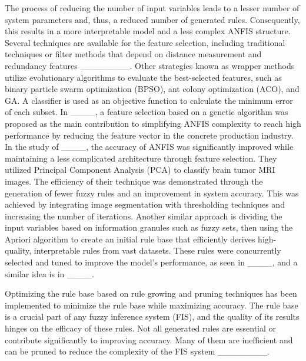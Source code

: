 The process of reducing the number of input variables leads to a lesser number of system parameters and, thus, a reduced number of generated rules. Consequently, this results in a more interpretable model and a less complex ANFIS structure. Several techniques are available for the feature selection, including traditional techniques or filter methods that depend on distance measurement and redundancy features ________. Other strategies known as wrapper methods utilize evolutionary algorithms to evaluate the best-selected features, such as binary particle swarm optimization (BPSO), ant colony optimization (ACO), and GA. A classifier is used as an objective function to calculate the minimum error of each subset.
In ____, a feature selection based on a genetic algorithm was proposed as the main contribution to simplifying ANFIS complexity to reach high performance by reducing the feature vector in the concrete production industry.
In the study of ____, the accuracy of ANFIS was significantly improved while maintaining a less complicated architecture through feature selection. They utilized Principal Component Analysis (PCA) to classify brain tumor MRI images. The efficiency of their technique was demonstrated through the generation of fewer fuzzy rules and an improvement in system accuracy. This was achieved by integrating image segmentation with thresholding techniques and increasing the number of iterations.
Another similar approach is dividing the input variables based on information granules such as fuzzy sets, then using the Apriori algorithm to create an initial rule base that efficiently derives high-quality, interpretable rules from vast datasets. These rules were concurrently selected and tuned to improve the model's performance, as seen in ____, and a similar idea is in ____.

Optimizing the rule base based on rule growing and pruning techniques has been implemented to minimize the rule base while maximizing accuracy. The rule base is a crucial part of any fuzzy inference system (FIS), and the quality of its results hinges on the efficacy of these rules. Not all generated rules are essential or contribute significantly to improving accuracy. Many of them are inefficient and can be pruned to reduce the complexity of the FIS system ________.

